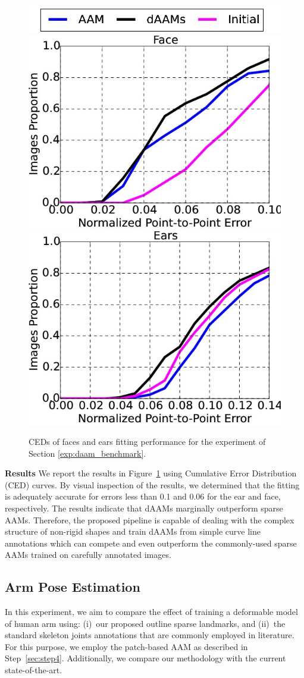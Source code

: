 \begin{figure}[b!]
    \vspace{-5pt}
    \centering
    \includegraphics[width=0.6\columnwidth]{resources/Annotation_Correction/DAAMBenchmark/legend}
    \\
    \includegraphics[width=0.48\columnwidth]{resources/Annotation_Correction/DAAMBenchmark/face}
    \includegraphics[width=0.48\columnwidth]{resources/Annotation_Correction/DAAMBenchmark/ear}
    \caption{CEDs of faces and ears fitting performance for the experiment of Section \ref{exp:daam_benchmark}.}
    \label{fig:daam_benchmark}
\end{figure}

\noindent\textbf{Results} We report the results in Figure~\ref{fig:daam_benchmark} using Cumulative Error Distribution (CED) curves. By visual inspection of the results, we determined that the fitting is adequately accurate for errors less than 0.1 and 0.06 for the ear and face, respectively. The results indicate that dAAMs marginally outperform sparse AAMs. Therefore, the proposed pipeline is capable of dealing with the complex structure of non-rigid shapes and train dAAMs from simple curve line annotations which can compete and even outperform the commonly-used sparse AAMs trained on carefully annotated images.


\subsection{Arm Pose Estimation}
\label{exp:benchmark}
In this experiment, we aim to compare the effect of training a deformable model of human arm using: (i)~our proposed outline sparse landmarks, and (ii)~the standard skeleton joints annotations that are commonly employed in literature. For this purpose, we employ the patch-based AAM as described in Step~\ref{sec:step4}. Additionally, we compare our methodology with the current state-of-the-art.


